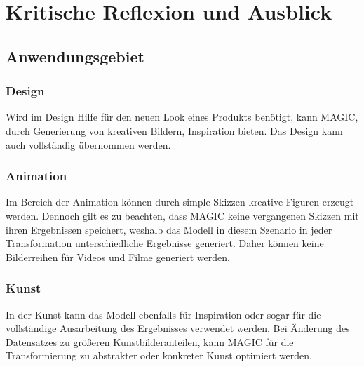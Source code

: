\documentclass[12pt,a4paper]{article}
\begin{document}
\newpage
\section{Kritische Reflexion und Ausblick} 
	\subsection{Anwendungsgebiet}
		\subsubsection*{Design}
			Wird im Design Hilfe für den neuen Look eines Produkts benötigt, kann MAGIC, durch Generierung von kreativen Bildern, Inspiration bieten.
			Das Design kann auch vollständig übernommen werden.

		\subsubsection*{Animation}
			Im Bereich der Animation können durch simple Skizzen kreative Figuren erzeugt werden.
			Dennoch gilt es zu beachten, dass MAGIC keine vergangenen Skizzen mit ihren Ergebnissen speichert, weshalb das Modell in diesem Szenario in jeder Transformation unterschiedliche Ergebnisse generiert.
			Daher können keine Bilderreihen für Videos und Filme generiert werden.

		\subsubsection*{Kunst}
			In der Kunst kann das Modell ebenfalls für Inspiration oder sogar für die vollständige Ausarbeitung des Ergebnisses verwendet werden.
			Bei Änderung des Datensatzes zu größeren Kunstbilderanteilen, kann MAGIC für die Transformierung zu abstrakter oder konkreter Kunst optimiert werden. 

\newpage
{}
\small
\printbibliography	
\end{document}
